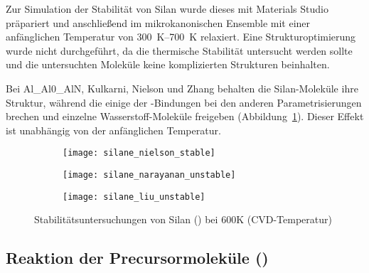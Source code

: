Zur Simulation der Stabilität von Silan wurde dieses mit Materials Studio präpariert und anschließend im mikrokanonischen Ensemble mit einer anfänglichen Temperatur von \SIrange{300}{700}{\kelvin} relaxiert.
Eine Strukturoptimierung wurde nicht durchgeführt, da die thermische Stabilität untersucht werden sollte und die untersuchten Moleküle keine komplizierten Strukturen beinhalten.

Bei Al\_Al0\_AlN, Kulkarni, Nielson und Zhang behalten die Silan-Moleküle ihre Struktur, während die einige der -Bindungen bei den anderen Parametrisierungen brechen und einzelne Wasserstoff-Moleküle freigeben (Abbildung~\ref{fig:silanestability}).
Dieser Effekt ist unabhängig von der anfänglichen Temperatur.

\begin{figure}[!ht]

  \captionsetup[subfigure]{singlelinecheck=false}
  \def\subfigwidth{0.32\textwidth}
  \begin{subfigure}[t]{3.5cm}
    \texttt{[image: silane\_nielson\_stable]}
  \end{subfigure}
  \hfill
  \begin{subfigure}[t]{4.5cm}
    \texttt{[image: silane\_narayanan\_unstable]}
  \end{subfigure}
  \hfill
  \begin{subfigure}[t]{5cm}
    \texttt{[image: silane\_liu\_unstable]}
  \end{subfigure}

  \caption[Stabilitätsuntersuchungen von Silan]{
    Stabilitätsuntersuchungen von Silan () bei 600K (CVD-Temperatur)
  }
  \label{fig:silanestability}

\end{figure}

\subsection{Reaktion der Precursormoleküle ()}

